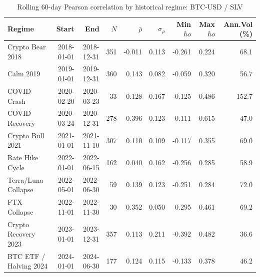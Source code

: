 \begin{table}[H]
\centering
\small
\caption{Rolling 60-day Pearson correlation by historical regime: BTC-USD / SLV}
\label{tab:regime_corr_BTCUSDSLV}
\begin{tabular}{lrrrrrrrr}
\toprule
Regime & Start & End & $N$ & $\bar{\rho}$ & $\sigma_\rho$ & Min $
ho$ & Max $
ho$ & Ann.Vol (\%) \\
\midrule
Crypto Bear 2018 & 2018-01-01 & 2018-12-31 & 351 & -0.011 & 0.113 & -0.261 & 0.224 & 68.1 \\
Calm 2019 & 2019-01-01 & 2019-12-31 & 360 & 0.143 & 0.082 & -0.059 & 0.320 & 56.7 \\
COVID Crash & 2020-02-20 & 2020-03-23 & 33 & 0.128 & 0.167 & -0.125 & 0.486 & 152.7 \\
COVID Recovery & 2020-03-24 & 2020-12-31 & 278 & 0.396 & 0.123 & 0.111 & 0.615 & 47.0 \\
Crypto Bull 2021 & 2021-01-01 & 2021-11-10 & 307 & 0.110 & 0.109 & -0.117 & 0.355 & 69.0 \\
Rate Hike Cycle & 2022-01-01 & 2022-06-15 & 162 & 0.040 & 0.162 & -0.256 & 0.285 & 58.9 \\
Terra/Luna Collapse & 2022-05-01 & 2022-06-30 & 59 & 0.139 & 0.123 & -0.251 & 0.284 & 72.0 \\
FTX Collapse & 2022-11-01 & 2022-11-30 & 30 & 0.352 & 0.050 & 0.295 & 0.461 & 69.2 \\
Crypto Recovery 2023 & 2023-01-01 & 2023-12-31 & 357 & 0.113 & 0.211 & -0.392 & 0.482 & 36.6 \\
BTC ETF / Halving 2024 & 2024-01-01 & 2024-06-30 & 177 & 0.124 & 0.115 & -0.133 & 0.378 & 46.2 \\
\bottomrule
\end{tabular}
\end{table}